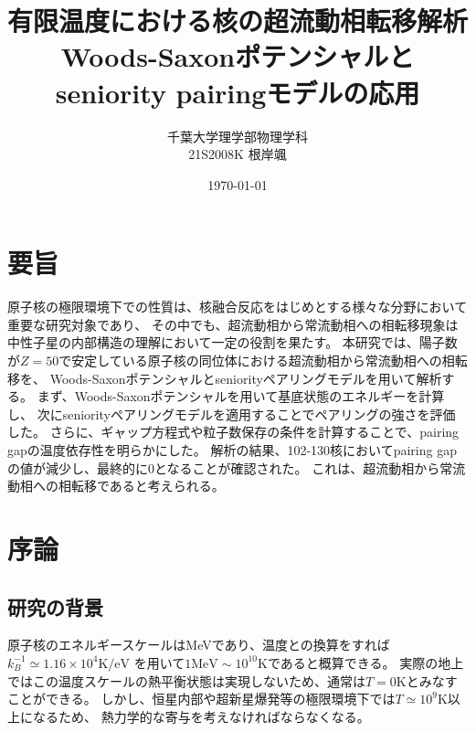 \documentclass[a4paper,11pt]{jsreport}
\title{有限温度における\ce{Sn}核の超流動相転移解析\\Woods-Saxonポテンシャルとseniority pairingモデルの応用}
\author{千葉大学理学部物理学科\\
21S2008K 根岸颯}
\date{\today}
\begin{document}
\maketitle
\chapter*{要旨}
  原子核の極限環境下での性質は、核融合反応をはじめとする様々な分野において重要な研究対象であり、
  その中でも、超流動相から常流動相への相転移現象は中性子星の内部構造の理解において一定の役割を果たす。
  本研究では、陽子数が$Z=50$で安定している原子核の同位体における超流動相から常流動相への相転移を、
  Woods-Saxonポテンシャルとseniorityペアリングモデルを用いて解析する。
  まず、Woods-Saxonポテンシャルを用いて基底状態のエネルギーを計算し、
  次にseniorityペアリングモデルを適用することでペアリングの強さを評価した。
  さらに、ギャップ方程式や粒子数保存の条件を計算することで、pairing gapの温度依存性を明らかにした。 
  解析の結果、102-130核においてpairing gapの値が減少し、最終的に0となることが確認された。
  これは、超流動相から常流動相への相転移であると考えられる。

\tableofcontents

\chapter{序論}
  \section{研究の背景}
  原子核のエネルギースケールはMeVであり、温度との換算をすれば$k_B^{-1}\simeq1.16\times10^4\text{K/eV}$
  を用いて\(1\text{MeV}\sim10^{10}\text{K}\)であると概算できる。
  実際の地上ではこの温度スケールの熱平衡状態は実現しないため、通常は\(T=0\text{K}\)とみなすことができる。
  しかし、恒星内部や超新星爆発等の極限環境下では\(T\simeq10^9\text{K}\)以上になるため、
  熱力学的な寄与を考えなければならなくなる。\par
  
\end{document}
